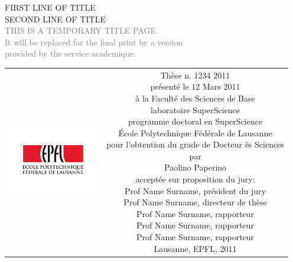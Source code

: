 \begin{titlepage}
\begin{center}
\sffamily


\null\vspace{2cm}
{\huge FIRST LINE OF TITLE \\[12pt] SECOND LINE OF TITLE} \\[24pt] 
\textcolor{gray}{\small{THIS IS A TEMPORARY TITLE PAGE \\ It will be replaced for the final print by a version \\ provided by the service academique.}}
    
\vfill

\begin{tabular} {cc}
\parbox{0.3\textwidth}{\includegraphics[width=4cm]{images/epfl}}
&
\parbox{0.7\textwidth}{%
	Thèse n. 1234 2011\\
	présenté le 12 Mars 2011\\
	à la Faculté des Sciences de Base\\
	laboratoire SuperScience\\
	programme doctoral en SuperScience\\
%
	École Polytechnique Fédérale de Lausanne\\[6pt]
	pour l'obtention du grade de Docteur ès Sciences\\
	par\\ [4pt]
	\null \hspace{3em} Paolino Paperino\\[9pt]
%
\small
acceptée sur proposition du jury:\\[4pt]
%
    Prof Name Surname, président du jury\\
    Prof Name Surname, directeur de thèse\\
    Prof Name Surname, rapporteur\\
    Prof Name Surname, rapporteur\\
    Prof Name Surname, rapporteur\\[12pt]
%
Lausanne, EPFL, 2011}
\end{tabular}
\end{center}
\vspace{2cm}
\end{titlepage}




